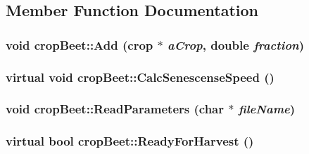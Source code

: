 \subsection{Member Function Documentation}
\hypertarget{classcrop_beet_a9fa3fb8bd859fd42e9ca6e888ccc349c}{
\subsubsection[{Add}]{\setlength{\rightskip}{0pt plus 5cm}void cropBeet::Add ({\bf crop} $\ast$ {\em aCrop}, \/  double {\em fraction})}}
\label{classcrop_beet_a9fa3fb8bd859fd42e9ca6e888ccc349c}
\hypertarget{classcrop_beet_a17329d19a1bedcce1b23b661b3d1d82a}{
\subsubsection[{CalcSenescenseSpeed}]{\setlength{\rightskip}{0pt plus 5cm}virtual void cropBeet::CalcSenescenseSpeed ()}}
\label{classcrop_beet_a17329d19a1bedcce1b23b661b3d1d82a}
\hypertarget{classcrop_beet_af71b9c0b8eba3bf313c7d5b9ce485533}{
\subsubsection[{ReadParameters}]{\setlength{\rightskip}{0pt plus 5cm}void cropBeet::ReadParameters (char $\ast$ {\em fileName})}}
\label{classcrop_beet_af71b9c0b8eba3bf313c7d5b9ce485533}
\hypertarget{classcrop_beet_a0d8bc5bc5f448342e8dd52824443ab63}{
\subsubsection[{ReadyForHarvest}]{\setlength{\rightskip}{0pt plus 5cm}virtual bool cropBeet::ReadyForHarvest ()}}
\label{classcrop_beet_a0d8bc5bc5f448342e8dd52824443ab63}


